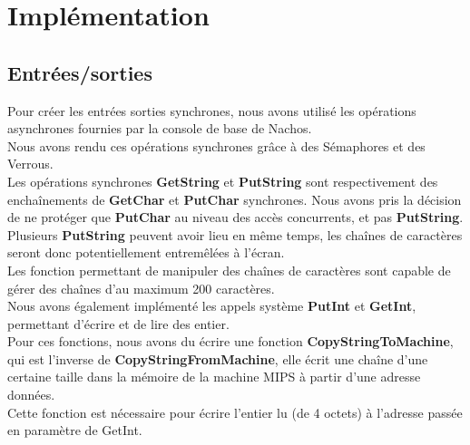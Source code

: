 \documentclass{report}
\begin{document}
\section*{Implémentation}
\subsection*{Entrées/sorties}

Pour créer les entrées sorties synchrones, nous avons utilisé les opérations asynchrones fournies par la console de base de Nachos.\\
Nous avons rendu ces opérations synchrones grâce à des Sémaphores et des Verrous.\\
Les opérations synchrones \textbf{GetString} et \textbf{PutString} sont respectivement des enchaînements de \textbf{GetChar} et \textbf{PutChar} synchrones.
Nous avons pris la décision de ne protéger que \textbf{PutChar} au niveau des accès concurrents, et pas \textbf{PutString}. Plusieurs \textbf{PutString} peuvent avoir lieu en même temps, les chaînes de caractères seront donc potentiellement entremêlées à l'écran.\\
Les fonction permettant de manipuler des chaînes de caractères sont capable de gérer des chaînes d'au maximum 200 caractères.\\

Nous avons également implémenté les appels système \textbf{PutInt} et \textbf{GetInt}, permettant d'écrire et de lire des entier.\\
Pour ces fonctions, nous avons du écrire une fonction \textbf{CopyStringToMachine}, qui est l'inverse de \textbf{CopyStringFromMachine}, elle écrit une chaîne d'une certaine taille dans la mémoire de la machine MIPS à partir d'une adresse données.\\
Cette fonction est nécessaire pour écrire l'entier lu (de 4 octets) à l'adresse passée en paramètre de GetInt.
\end{document}
